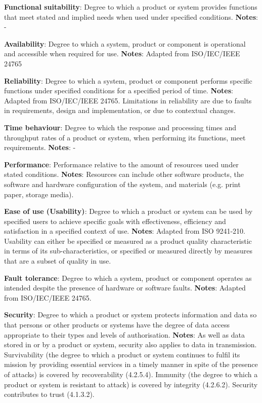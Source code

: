 \textbf{Functional suitability}: Degree to which a product or system provides functions that meet stated and implied needs when used under specified conditions. \textbf{Notes}: -

\textbf{Availability}: Degree to which a system, product or component is operational and accessible when required for use. \textbf{Notes}: Adapted from ISO/IEC/IEEE 24765

\textbf{Reliability}: Degree to which a system, product or component performs specific functions under specified conditions for a specified period of time. \textbf{Notes}: Adapted from ISO/IEC/IEEE 24765. Limitations in reliability are due to faults in requirements, design and implementation, or due to contextual changes.

\textbf{Time behaviour}: Degree to which the response and processing times and throughput rates of a product or system, when performing its functions, meet requirements. \textbf{Notes}: -

\textbf{Performance}: Performance relative to the amount of resources used under stated conditions. \textbf{Notes}: Resources can include other software products, the software and hardware configuration of the system, and materials (e.g. print paper, storage media).

\textbf{Ease of use (Usability)}: Degree to which a product or system can be used by specified users to achieve specific goals with effectiveness, efficiency and satisfaction in a specified context of use. \textbf{Notes}: Adapted from ISO 9241-210. Usability can either be specified or measured as a product quality characteristic in terms of its sub-characteristics, or specified or measured directly by measures that are a subset of quality in use.

\textbf{Fault tolerance}: Degree to which a system, product or component operates as intended despite the presence of hardware or software faults. \textbf{Notes}: Adapted from ISO/IEC/IEEE 24765.

\textbf{Security}: Degree to which a product or system protects information and data so that persons or other products or systems have the degree of data access appropriate to their types and levels of authorisation. \textbf{Notes}: As well as data stored in or by a product or system, security also applies to data in transmission. Survivability (the degree to which a product or system continues to fulfil its mission by providing essential services in a timely manner in spite of the presence of attacks) is covered by recoverability (4.2.5.4). Immunity (the degree to which a product or system is resistant to attack) is covered by integrity (4.2.6.2). Security contributes to trust (4.1.3.2).


